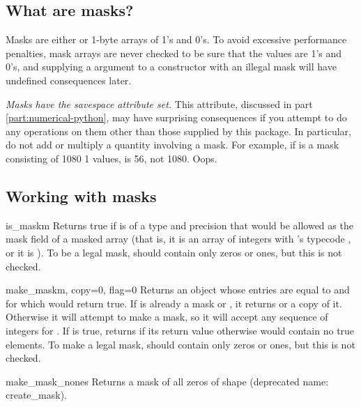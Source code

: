 \subsection{What are masks?}
\label{sec:numarray.ma:what-are-masks}

Masks are either  or 1-byte \module{\numarray} arrays of 1's and
0's. To avoid excessive performance penalties, mask arrays are never checked to
be sure that the values are 1's and 0's, and supplying a  argument to
a constructor with an illegal mask will have undefined consequences later.

\emph{Masks have the savespace attribute set.}  This attribute, discussed in
part \ref{part:numerical-python}, may have surprising consequences if you
attempt to do any operations on them other than those supplied by this package.
In particular, do not add or multiply a quantity involving a mask. For example,
if  is a mask consisting of 1080 1 values,  is 56, not
1080. Oops.


\subsection{Working with masks}

\begin{funcdesc}{is_mask}{m}
   Returns true if  is of a type and precision that would be allowed as
   the mask field of a masked array (that is, it is an array of integers with
   \module{\numarray}'s typecode , or it is ).
   To be a legal mask,  should contain only zeros or ones, but this is
   not checked.
\end{funcdesc}

\begin{funcdesc}{make_mask}{m, copy=0, flag=0}
   Returns an object whose entries are equal to  and for which
    would return true. If  is already a mask or
   , it returns  or a copy of it. Otherwise it will
   attempt to make a mask, so it will accept any sequence of integers for
   . If  is true,  returns 
   if its return value otherwise would contain no true elements. To make a
   legal mask,  should contain only zeros or ones, but this is not
   checked.
\end{funcdesc}

\begin{funcdesc}{make_mask_none}{s}
   Returns a mask of all zeros of shape  (deprecated name:
   create_mask).
\end{funcdesc}

